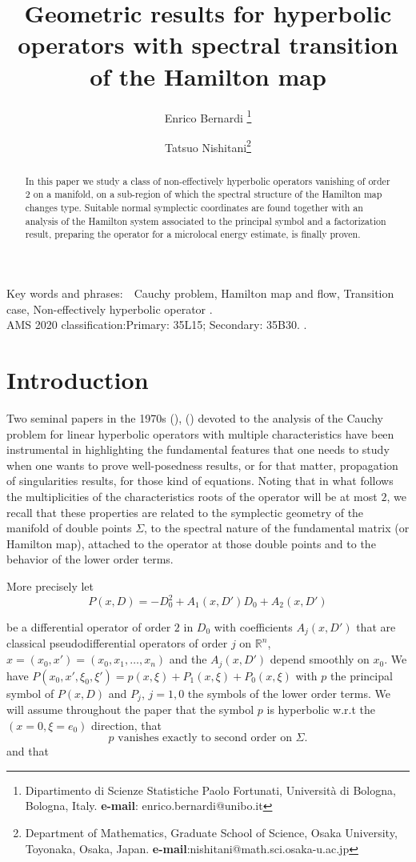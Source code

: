 \documentclass[12pt,leqno]{article} %
\title{Geometric results for hyperbolic operators with spectral transition of the Hamilton map }
\author{ Enrico Bernardi \thanks{Dipartimento di Scienze Statistiche Paolo Fortunati, Universit\`a di Bologna, Bologna, Italy. \textbf{e-mail}: enrico.bernardi@unibo.it} \and
Tatsuo Nishitani\thanks{Department of Mathematics, Graduate School of Science, Osaka University,
  Toyonaka, Osaka, Japan.  \textbf{e-mail}:nishitani@math.sci.osaka-u.ac.jp}
}
\date{} %
\def\R{{\mathbb R}}
\def\R{\mathbb{R}}
\numberwithin{equation}{section}
\begin{document}
\maketitle
\bigskip
	
\begin{abstract}
In this paper we study a class of non-effectively hyperbolic operators vanishing of
order $ 2 $ on a manifold, on a sub-region of  which the spectral structure of the
Hamilton map changes type. Suitable normal symplectic coordinates are found
together with an analysis of the Hamilton system associated to the
principal symbol and a  factorization result, preparing the operator for a microlocal energy
estimate, is finally proven. 
\end{abstract}
	
Key words and phrases:~~Cauchy problem, Hamilton map and flow, Transition case, Non-effectively hyperbolic operator . \\
	
AMS 2020 classification:Primary: 35L15; Secondary: 35B30. .
	
\allowdisplaybreaks
		
\section{Introduction}\label{sec:intro}


Two seminal papers in the 1970s (\cite{MR427843}), (\cite{MR492751}) devoted to the analysis of
the Cauchy problem for linear hyperbolic operators with multiple
characteristics have been instrumental in highlighting the fundamental
features that one needs to study when one wants to prove
well-posedness results, or for that matter, propagation of
singularities results, for those kind of equations.
Noting that in  what follows the multiplicities of the characteristics
roots of the operator will
be at most $ 2 $, we recall that
these properties are related to the symplectic
geometry of the manifold of double points $ \Sigma $, to the spectral nature
of the fundamental matrix (or Hamilton map), attached to the operator at those double
points and to the behavior of the lower order terms.

More precisely let
\begin{equation}
  \label{eq:1}
  P(x,D) = -D_{0}^{2} + A_{1}(x,D')D_{0} + A_{2}(x,D')
\end{equation}

be a differential operator of order $ 2 $ in $ D_{0} $ with
coefficients $ A_{j}(x,D') $ that are classical pseudodifferential
operators of order $ j $ on $ \R^{n} $, $
x=(x_{0},x')=(x_{0},x_{1},\ldots,x_{n}) $ and the $ A_{j}(x,D') $
depend smoothly on $ x_{0} $. We have $ P(x_{0},x',\xi_{0},\xi') =
p(x,\xi) + P_{1}(x,\xi) + P_{0}(x,\xi) $ with $ p $ the principal
symbol of $ P(x,D) $ and $ P_{j} $, $ j=1,0 $ the symbols of the lower
order terms. We will assume throughout the paper that the symbol $ p $
is hyperbolic w.r.t the $ (x=0,\xi=e_{0}) $ direction, that
\begin{equation}
\label{eq:2ji}
\text{$p$ vanishes exactly to second order on $\Sigma$.}
\end{equation}
and that
\end{document}
